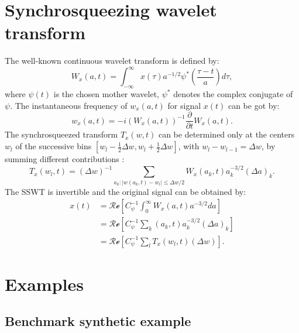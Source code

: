 \section{Synchrosqueezing wavelet transform}
The well-known continuous wavelet transform is defined by:
\begin{equation}
\label{eq:w1t}
W_x(a,t)=\int_{-\infty}^{\infty}x(\tau)a^{-1/2}\psi^*\left(\frac{\tau-t}{a}\right)d\tau,
\end{equation}
where $\psi(t)$ is the chosen mother wavelet, $\psi^*$ denotes the complex conjugate of $\psi$. The instantaneous frequency of $w_x(a,t)$ for signal $x(t)$ can be got by:
\begin{equation}
\label{eq:instf}
w_x(a,t) = -i(W_x(a,t))^{-1}\frac{\partial}{\partial t}W_x(a,t).
\end{equation}
The synchrosqueezed transform $T_x(w,t)$ can be determined only at the centers $w_l$ of the successive bins $[w_l-\frac{1}{2}\Delta w,w_l+\frac{1}{2}\Delta w]$, with $w_l-w_{l-1}=\Delta w$, by summing
different contributions \cite[]{daubechies2011}:
\begin{equation}
\label{eq:sswt}
T_x(w_l,t)=(\Delta w)^{-1} \sum_{a_k:|w(a_k,t)-w_l|\le \Delta w/2}^{} W_x(a_k,t)a_k^{-3/2}(\Delta a)_k.
\end{equation}
The SSWT is invertible and the original signal can be obtained by:
\begin{equation}
\label{eq:sswt2}
\begin{split}
x(t) &= \mathcal{Re}\left[C_{\psi}^{-1}\int_{0}^{\infty}W_x(a,t)a^{-3/2}da\right] \\
	 &=\mathcal{Re}\left[C_{\psi}^{-1}\sum_{k}(a_k,t)a_k^{-3/2}(\Delta a)_k\right] \\
     &=\mathcal{Re}\left[C_{\psi}^{-1}\sum_{l}T_x(w_l,t)(\Delta w)\right].
\end{split}
\end{equation}

\section{Examples}
\subsection{Benchmark synthetic example}


